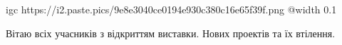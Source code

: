  
 
 
 
 

\qqSecCmt


\ifcmt
  igc https://i2.paste.pics/9e8e3040ce0194e930c380c16e65f39f.png
	@width 0.1
\fi


Вітаю всіх учасників з відкриттям виставки. Нових проектів та їх втілення.
